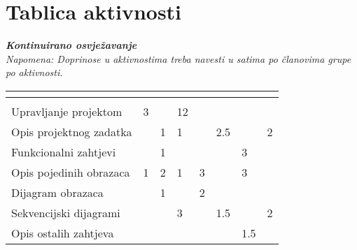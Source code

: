 \begin{packed_enum}
			
		\end{packed_enum}
		
		\eject
		\section*{Tablica aktivnosti}
		
			\textbf{\textit{Kontinuirano osvježavanje}}\\
			
			 \textit{Napomena: Doprinose u aktivnostima treba navesti u satima po članovima grupe po aktivnosti.}
					
						
			
			\begin{longtabu} to \textwidth {|X[7, l]|X[1, c]|X[1, c]|X[1, c]|X[1, c]|X[1, c]|X[1, c]|X[1, c]|}
								
				  &      &  &	 &	 &
				 &
				 &	 \\ \hline 
				\endfirsthead
				
			
				  &      &  &	 &
				 &	 &
				 &	 \\ \hline 
				\endhead
				
				
				\endfoot
							
				 
				\endlastfoot
				
				Upravljanje projektom 		& 3 &  & 12 &  &  &  & \\ \hline
				Opis projektnog zadatka 	&  & 1 & 1 &  & 2.5  &  & 2\\ \hline
				
				Funkcionalni zahtjevi       &  & 1 &  &  &  & 3 &  \\ \hline
				Opis pojedinih obrazaca 	& 1 & 2 & 1 & 3 &  & 3 & \\ \hline
				Dijagram obrazaca 			&  & 1 &  & 2 &  &  & \\ \hline
				Sekvencijski dijagrami 		&  &  & 3 &  & 1.5 &  & 2\\ \hline
				Opis ostalih zahtjeva 		&  &  &  &  &  & 1.5 &  \\ \hline


\end{longtabu}
